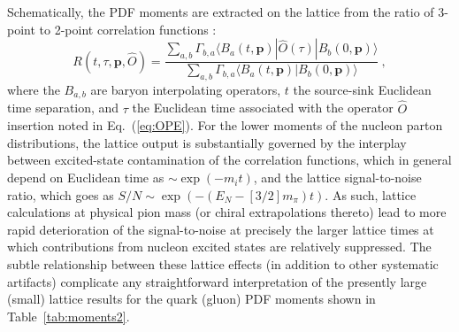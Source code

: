 Schematically, the PDF moments are extracted on the lattice from the ratio of 3-point to 2-point correlation functions
\cite{Gockeler:1995wg,Lin:2017snn}:
%
\begin{equation}
	R(t,\tau,\mathbf{p},\hat{O}) = \frac{\sum_{a,b} \Gamma_{b,a} \langle B_a(t,\mathbf{p}) | \hat{O}(\tau) |
	B_b(0,\mathbf{p}) \rangle}{\sum_{a,b} \Gamma_{b,a} \langle B_a(t,\mathbf{p}) | B_b(0,\mathbf{p}) \rangle}\ ,
\end{equation}
%
where the $B_{a,b}$ are baryon interpolating operators, $t$ the source-sink Euclidean time separation, and $\tau$ the Euclidean
time associated with the operator $\hat{O}$ insertion noted in Eq.~(\ref{eq:OPE}). For the lower moments of the nucleon
parton distributions, the lattice output is substantially governed by the interplay between excited-state contamination
of the correlation functions, which in general depend on Euclidean time as $\sim\! \exp{(-m_i t)}$, and the lattice signal-to-noise
ratio, which goes as $S/N\! \sim\! \exp{(-(E_N -[3/2]m_\pi) t)}$. As such, lattice calculations at physical pion mass (or chiral
extrapolations thereto) lead to more rapid deterioration of the signal-to-noise at precisely the larger lattice times at
which contributions from nucleon excited states are relatively suppressed. The subtle relationship between these lattice effects
(in addition to other systematic artifacts) complicate any straightforward interpretation of the presently large (small)
lattice results for the quark (gluon) PDF moments shown in Table~\ref{tab:moments2}.




\clearpage
